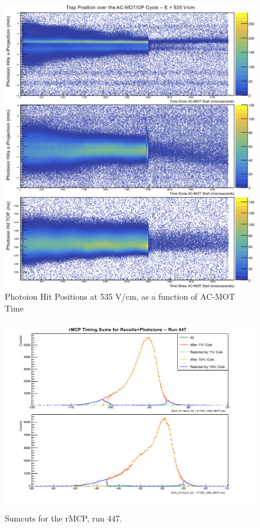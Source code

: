 \begin{figure}[h!!t]
	\centering
	\includegraphics[width=.999\linewidth]
	{Figures/rMCP_xyz_vs_acmottime.png}
	\caption[Photoion Hit Positions at 535 V/cm, as a function of AC-MOT Time]{Photoion Hit Positions at 535 V/cm, as a function of AC-MOT Time}	
\end{figure}
\begin{figure}[h!!t]
	\centering
	\includegraphics[width=.999\linewidth]
	{Figures/rMCP_sumcuts_447.pdf}
	\caption[Sumcuts for the rMCP, run 447.]{Sumcuts for the rMCP, run 447.}	
\end{figure}
